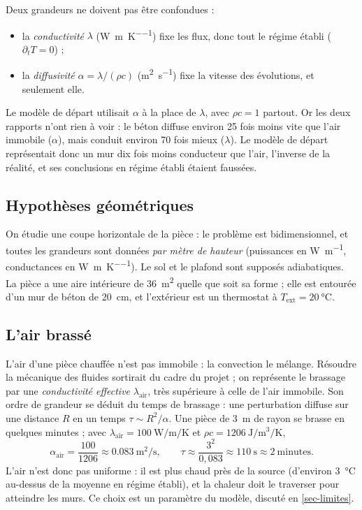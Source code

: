 \documentclass[11pt,a4paper]{article}
\theoremstyle{definition}
\theoremstyle{remark}
\newcommand{\Text}{T_{\mathrm{ext}}}
\newcommand{\la}{\lambda_{\mathrm{air}}}
\begin{document}
Deux grandeurs ne doivent pas être confondues :
\begin{itemize}
  \item la \emph{conductivité} $\lambda$ (\unit{\watt\per\metre\per\kelvin}) fixe les
  flux, donc tout le régime établi ($\partial_t T = 0$) ;
  \item la \emph{diffusivité} $\alpha = \lambda/(\rho c)$ (\unit{\square\metre\per\second})
  fixe la vitesse des évolutions, et seulement elle.
\end{itemize}
Le modèle de départ utilisait $\alpha$ à la place de $\lambda$, avec $\rho c = 1$
partout. Or les deux rapports n'ont rien à voir : le béton diffuse environ 25 fois
moins vite que l'air immobile ($\alpha$), mais conduit environ 70 fois mieux
($\lambda$). Le modèle de départ représentait donc un mur dix fois moins conducteur
que l'air, l'inverse de la réalité, et ses conclusions en régime établi étaient
faussées.

\subsection{Hypothèses géométriques}

On étudie une coupe horizontale de la pièce : le problème est bidimensionnel, et
toutes les grandeurs sont données \emph{par mètre de hauteur} (puissances en
\unit{\watt\per\metre}, conductances en \unit{\watt\per\metre\per\kelvin}). Le sol et
le plafond sont supposés adiabatiques. La pièce a une aire intérieure de
\qty{36}{\square\metre} quelle que soit sa forme ; elle est entourée d'un mur de
béton de \qty{20}{\centi\metre}, et l'extérieur est un thermostat à
$\Text = \qty{20}{\degreeCelsius}$.

\subsection{L'air brassé}

L'air d'une pièce chauffée n'est pas immobile : la convection le mélange. Résoudre
la mécanique des fluides sortirait du cadre du projet ; on représente le brassage
par une \emph{conductivité effective} $\la$, très supérieure à celle de l'air
immobile. Son ordre de grandeur se déduit du temps de brassage : une perturbation
diffuse sur une distance $R$ en un temps $\tau \sim R^2/\alpha$. Une pièce de
\qty{3}{\metre} de rayon se brasse en quelques minutes ; avec
$\la = \qty{100}{\watt\per\metre\per\kelvin}$ et $\rho c = \qty{1206}{\joule\per\cubic\metre\per\kelvin}$,
\[
\alpha_{\mathrm{air}} = \frac{100}{1206} \approx \qty{0,083}{\square\metre\per\second},
\qquad \tau \approx \frac{3^2}{0,083} \approx \qty{110}{\second} \approx 2~\text{minutes}.
\]
L'air n'est donc pas uniforme : il est plus chaud près de la source (d'environ
\qty{3}{\degreeCelsius} au-dessus de la moyenne en régime établi), et la chaleur
doit le traverser pour atteindre les murs. Ce choix est un paramètre du modèle,
discuté en \cref{sec-limites}.
\end{document}

